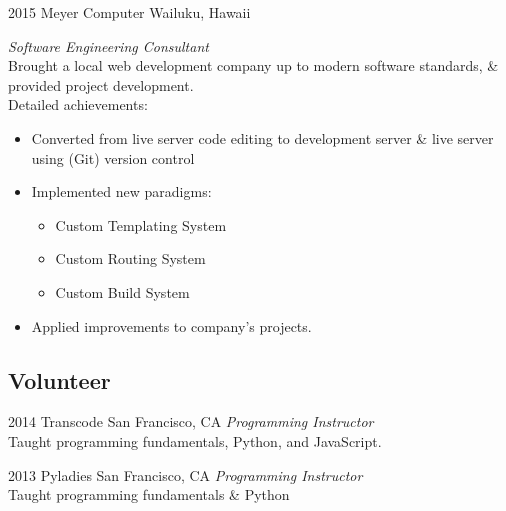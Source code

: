 \documentclass[]{friggeri-cv} %
\begin{document}
\begin{entrylist}


\entry
{2015}
{Meyer Computer}
{Wailuku, Hawaii}
{\emph{Software Engineering Consultant} \\
Brought a local web development company up to modern software standards, \& provided project development. \\Detailed achievements:
\begin{itemize}
\item Converted from live server code editing to development server \& live server using (Git) version control
\item Implemented new paradigms:
\begin{itemize}
\item Custom Templating System
\item Custom Routing System
\item Custom Build System
\end{itemize}
\item Applied improvements to company’s projects.
\end{itemize}}


\end{entrylist}

\subsection{Volunteer}

\begin{entrylist}

\entry
{2014}
{Transcode}
{San Francisco, CA}
{\emph{Programming Instructor} \\
Taught programming fundamentals, Python, and JavaScript.}


\entry
{2013}
{Pyladies}
{San Francisco, CA}
{\emph{Programming Instructor} \\
Taught programming fundamentals \& Python}



\end{entrylist}

\end{document}
